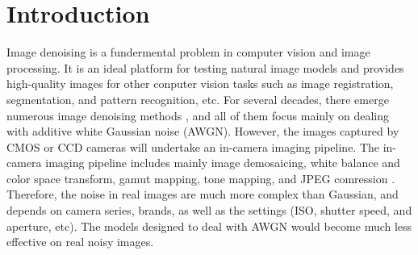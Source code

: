 \documentclass[10pt,twocolumn,letterpaper]{article}
\begin{document}
\section{Introduction}
Image denoising is a fundermental problem in computer vision and image processing. It is an ideal platform for testing natural image models and provides high-quality images for other conputer vision tasks such as image registration, segmentation, and pattern recognition, etc. For several decades, there emerge numerous image denoising methods \cite{nlm,foe,ksvd,bm3d,lssc,epll,mlp,wnnm,csf,pgpd,chen2015learning}, and all of them focus mainly on dealing with additive white Gaussian noise (AWGN). However, the images captured by CMOS or CCD cameras will undertake an in-camera imaging pipeline. The in-camera imaging pipeline includes mainly image demosaicing, white balance and color space transform, gamut mapping, tone mapping, and JPEG comression \cite{NewInCamera,crosschannel2016}. Therefore, the noise in real images are much more complex than Gaussian, and depends on camera series, brands, as well as the settings (ISO, shutter speed, and aperture, etc). The models designed to deal with AWGN would become much less effective on real noisy images.

\end{document}
